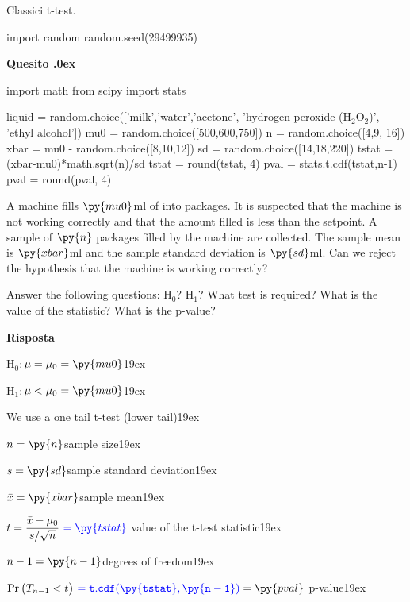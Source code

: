 \documentclass[11pt,twoside,a4paper]{article}
\newcounter{quesito}
\newenvironment{question}{\bigskip\addtocounter{quesito}{1}\bigskip\bigskip\par\textbf{Quesito \thequesito.\kern0ex}}{\par\vspace{\parskip}}
\newenvironment{answer}{\par\textbf{Risposta\quad}}{\par\vspace{\parskip}}
\begin{document}
\colorbox{blue!10}{\begin{minipage}{\textwidth}
Classici t-test.
\end{minipage}}

\bigskip\bigskip


\begin{pycode}
import random
random.seed(29499935)
\end{pycode}

\begin{question}
\begin{pycode}
import math
from scipy import stats

liquid = random.choice(['milk','water','acetone', 'hydrogen peroxide (H$_2$O$_2$)', 'ethyl alcohol'])
mu0 = random.choice([500,600,750])
n = random.choice([4,9, 16])
xbar = mu0 - random.choice([8,10,12])
sd = random.choice([14,18,220])
tstat = (xbar-mu0)*math.sqrt(n)/sd
tstat = round(tstat, 4)
pval = stats.t.cdf(tstat,n-1)
pval = round(pval, 4)
\end{pycode}
A machine fills $\py{mu0}$ml of  into packages. It is suspected that the machine is not working correctly and that the amount filled is less than the setpoint. A sample of $\py{n}$ packages filled by the machine are collected. The sample mean is $\py{xbar}$ml and the sample standard deviation is $\py{sd}$ml. Can we reject the hypothesis that the machine is working correctly?

Answer the following questions: H$_0$? H$_1$? What test is required? What is the value of the statistic? What is the p-value? 


\begin{answer}

  {\color{blue}
  H$_0:$\hfill $\mu = \mu_0 = \py{mu0}$\kern19ex
  
  H$_1:$\hfill $\mu<\mu_0 = \py{mu0}$\kern19ex
  
  We use a one tail t-test (lower tail)\kern19ex}
  
  $n = \py{n}$\hfill sample size\kern19ex
  
  $s = \py{sd}$\hfill sample standard deviation\kern19ex
  
  $\bar{x} = \py{xbar}$\hfill sample mean\kern19ex
  
  $t = \displaystyle\frac{\bar{x}-\mu_0}{s/\sqrt{n}}\ {\color{blue} = \py{tstat}}$\hfill{\color{blue} value of the t-test statistic}\kern19ex
  
  $n-1 = \py{n-1}$\hfill degrees of freedom\kern19ex
  
  $\Pr\big(T_{n-1}<t\big)\ {\color{blue} = {\tt t.cdf(\py{tstat},\py{n-1} ) }} = \py{pval}$\hfill{\color{blue} p-value}\kern19ex

\end{answer}
\end{question}
\end{document}
